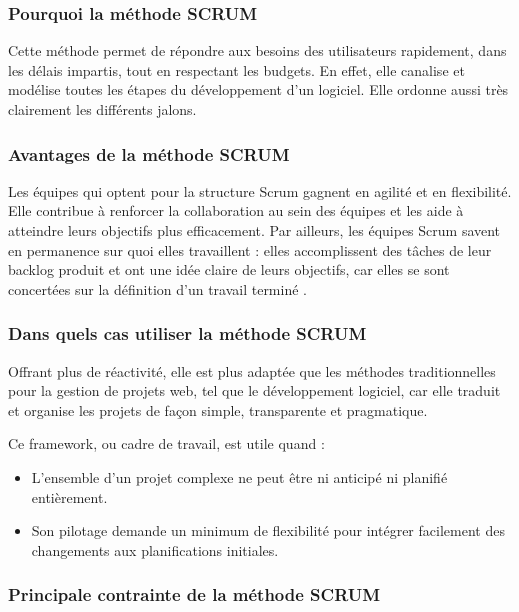\subsubsection{Pourquoi la méthode SCRUM}

Cette méthode permet de répondre aux besoins des utilisateurs rapidement, dans les délais
impartis, tout en respectant les budgets. En effet, elle canalise et modélise toutes les étapes du
développement d’un logiciel. Elle ordonne aussi très clairement les différents jalons.

\subsubsection{Avantages de la méthode SCRUM}

Les équipes qui optent pour la structure Scrum gagnent en agilité et en flexibilité. Elle contribue à renforcer la collaboration au sein des équipes et les aide à atteindre leurs objectifs plus efficacement. Par ailleurs, les équipes Scrum savent en permanence sur quoi elles travaillent : elles accomplissent des tâches de leur backlog produit et ont une idée claire de leurs objectifs, car elles se sont concertées sur la définition d’un travail \og terminé \fg.

\subsubsection{Dans quels cas utiliser la méthode SCRUM}

Offrant plus de réactivité, elle est plus adaptée que les méthodes traditionnelles pour la gestion de projets web, tel que le développement logiciel, car elle traduit et organise les projets de façon simple, transparente et pragmatique.

Ce framework, ou cadre de travail, est utile quand :

\vspace{1em}
\begin{itemize}
	\setlength\itemsep{1em}
	\item L’ensemble d’un projet complexe ne peut être ni anticipé ni planifié entièrement.
	\item Son pilotage demande un minimum de flexibilité pour intégrer facilement des changements aux planifications initiales.
\end{itemize}

\subsubsection{Principale contrainte de la méthode SCRUM}

